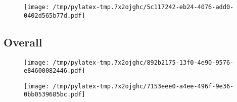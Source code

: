 \documentclass{article}%
\begin{document}
%


\begin{figure}[htbp]%
\centering%
\texttt{[image: /tmp/pylatex-tmp.7x2ojghc/5c117242-eb24-4076-add0-0402d565b77d.pdf]}%
\end{figure}

%
\newpage %
\subsection{Overall}%
\label{subsec:Overall}%


\begin{figure}[htbp]%
\centering%
\texttt{[image: /tmp/pylatex-tmp.7x2ojghc/892b2175-13f0-4e90-9576-e84600082446.pdf]}%
\end{figure}

%


\begin{figure}[htbp]%
\centering%
\texttt{[image: /tmp/pylatex-tmp.7x2ojghc/7153eee0-a4ee-496f-9e36-0bb0539685bc.pdf]}%
\end{figure}

%
\end{document}
